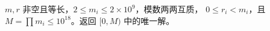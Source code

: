 $m,r$ 非空且等长，$2\le m_i\le 2\times 10^9$，模数两两互质，
$0\le r_i<m_i$，且 $M=\prod m_i\le 10^{18}$。返回 $[0,M)$ 中的唯一解。

